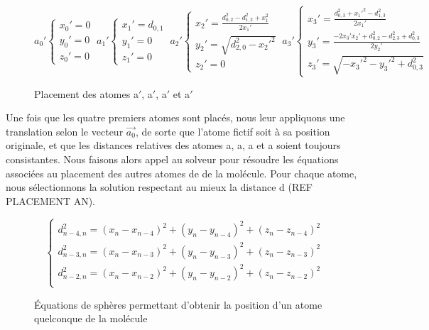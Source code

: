 \begin{figure}[!h]
	\centering
	
	\[
	a_{0}'\left \{
   	\begin{array}{l}
      x_{0}'=0\\
      y_{0}'=0\\
	  z_{0}'=0
   	\end{array}
   	\right .
   	\:
   	a_{1}'\left \{
   	\begin{array}{l}
      x_{1}'=d_{0,1}\\
      y_{1}'=0\\
	  z_{1}'=0
   	\end{array}
   	\right .
   	\:
	a_{2}'\left \{
   	\begin{array}{l}
      x_{2}'=\frac{d_{0,2}^2 - d_{1,2}^2 + x_{1}^2}{2x_{1}'}\\
      y_{2}'=\sqrt{d_{2,0}^2 - x_{2}'^2}\\
	  z_{2}'=0
   	\end{array}
   	\right .
   	\:
   	a_{3}'\left \{
   	\begin{array}{l}
      x_{3}'=\frac{d_{0,3}^2+x_1'^2-d_{1,3}^2}{2x_{1}'}\\
      y_{3}'=\frac{-2x_3'x_2'+d_{0,2}^2-d_{2,3}^2+d_{0,3}^2}{2y_2'}\\
	  z_{3}'=\sqrt{-x_3'^2-y_3'^2+d_{0,3}^2}
   	\end{array}
   	\right .
	\]
		
	\caption{Placement des atomes a$'$, a$'$, a$'$ et a$'$}
\end{figure}


\par Une fois que les quatre premiers atomes sont placés, nous leur appliquons une translation selon le vecteur $\vec{a_0}$, de sorte que l'atome fictif soit à sa position originale, et que les distances relatives des atomes a, a, a et a soient toujours consistantes. Nous faisons alors appel au solveur pour résoudre les équations associées au placement des autres atomes de de la molécule. Pour chaque atome, nous sélectionnons la solution respectant au mieux la distance d (REF PLACEMENT AN).


\begin{figure}[!h]
	\centering
	
	\[
	\left \{
   	\begin{array}{l}
      d_{n-4,n}^2=(x_n-x_{n-4})^2 + (y_n-y_{n-4})^2 + (z_n-z_{n-4})^2\\
	  d_{n-3,n}^2=(x_n-x_{n-3})^2 + (y_n-y_{n-3})^2 + (z_n-z_{n-3})^2\\
      d_{n-2,n}^2=(x_n-x_{n-2})^2 + (y_n-y_{n-2})^2 + (z_n-z_{n-2})^2\\
   	\end{array}
   	\right .
	\]
	
	\caption{Équations de sphères permettant d'obtenir la position d'un atome quelconque de la molécule}
\end{figure}

